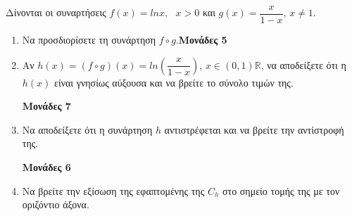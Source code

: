 \documentclass[12pt]{article}
\begin{document}
		Δίνονται οι συναρτήσεις $f(x)=lnx,\mbox{ } x>0$ και $g(x)=\dfrac{x}{1-x}$, $x\neq 1$.
		\begin{enumerate}[label=\textbf{\roman*.}]
			\item{Να προσδιορίσετε τη συνάρτηση $f\circ g$}.\hfill \textbf{Μονάδες 5}
			
			\item Αν $h(x)=(f\circ g)(x)=ln\left(\dfrac{x}{1-x}\right)$,	$x\in(0,1) \mathbb{R} $, να αποδείξετε ότι η $h(x)$ είναι γνησίως αύξουσα και να βρείτε το σύνολο τιμών της.\\\strut \hfill \textbf{Μονάδες 7}
			
			
			
			\item  Να αποδείξετε ότι η συνάρτηση $h$ αντιστρέφεται και να βρείτε την αντίστροφή της. \\ \strut  \hfill \textbf{Μονάδες 6}
			
			
			\item Να βρείτε την εξίσωση της εφαπτομένης της $C_h$ στο σημείο τομής της με τον οριζόντιο  άξονα. 
		\end{enumerate}
\end{document}
